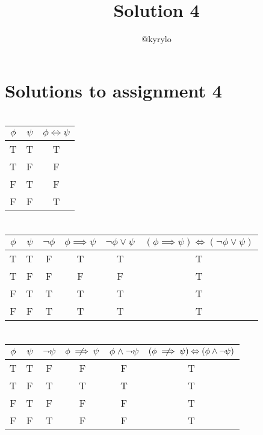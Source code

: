 \documentclass{article}
\title{Solution 4}
\author{@kyrylo}
\begin{document}
\section*{Solutions to assignment 4}

\section{}

\begin{tabular}{ | c | c | c | }
  \hline
  $\phi$ & $\psi$ & $\phi \Leftrightarrow \psi$ \\
  \hline
  T & T & T \\
  T & F & F \\
  F & T & F \\
  F & F & T \\
  \hline
\end{tabular}

\section{}

\begin{tabular}{ | c | c | c | c | c | c | }
  \hline
  $\phi$ & $\psi$ & $\neg \phi$ & $\phi \implies \psi$ & $\neg \phi \vee \psi$ &  $(\phi \implies \psi) \Leftrightarrow (\neg \phi \vee \psi)$ \\
  \hline
  T & T & F & T & T & T \\
  T & F & F & F & F & T \\
  F & T & T & T & T & T \\
  F & F & T & T & T & T \\
  \hline
\end{tabular}

\section{}

\begin{tabular}{ | c | c | c | c | c | c | }
  \hline
  $\phi$ & $\psi$ & $\neg \psi$ & $\phi \centernot\implies \psi$ & $\phi \wedge \neg\psi$ &  $(\phi \centernot\implies \psi) \Leftrightarrow (\phi \wedge \neg\psi)$ \\
  \hline
  T & T & F & F & F & T \\
  T & F & T & T & T & T \\
  F & T & F & F & F & T \\
  F & F & T & F & F & T \\
  \hline
\end{tabular}
\end{document}
